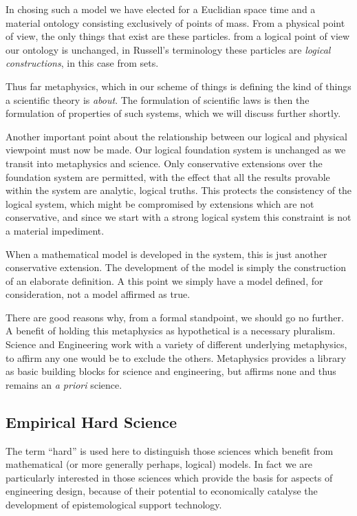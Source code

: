In chosing such a model we have elected for a Euclidian space time and a material ontology consisting exclusively of points of mass.
From a physical point of view, the only things that exist are these particles.
from a logical point of view our ontology is unchanged, in Russell's terminology these particles are {\it logical constructions}, in this case from sets.

Thus far metaphysics, which in our scheme of things is defining the kind of things a scientific theory is {\it about}.
The formulation of scientific laws is then the formulation of properties of such systems, which we will discuss further shortly.

Another important point about the relationship between our logical and physical viewpoint must now be made.
Our logical foundation system is unchanged as we transit into metaphysics and science.
Only conservative extensions over the foundation system are permitted, with the effect that all the results provable within the system are analytic, logical truths.
This protects the consistency of the logical system, which might be compromised by extensions which are not conservative, and since we start with a strong logical system this constraint is not a material impediment.

When a mathematical model is developed in the system, this is just another conservative extension.
The development of the model is simply the construction of an elaborate definition.
A this point we simply have a model defined, for consideration, not a model affirmed as true.

There are good reasons why, from a formal standpoint, we should go no further.
A benefit of holding this metaphysics as hypothetical is a necessary pluralism.
Science and Engineering work with a variety of different underlying metaphysics, to affirm any one would be to exclude the others.
Metaphysics provides a library as basic building blocks for science and engineering, but affirms none and thus remains an {\it a priori} science.

\subsection{Empirical Hard Science}

The term ``hard'' is used here to distinguish those sciences which benefit from mathematical (or more generally perhaps, logical) models.
In fact we are particularly interested in those sciences which provide the basis for aspects of engineering design, because of their potential to economically catalyse the development of epistemological support technology.

